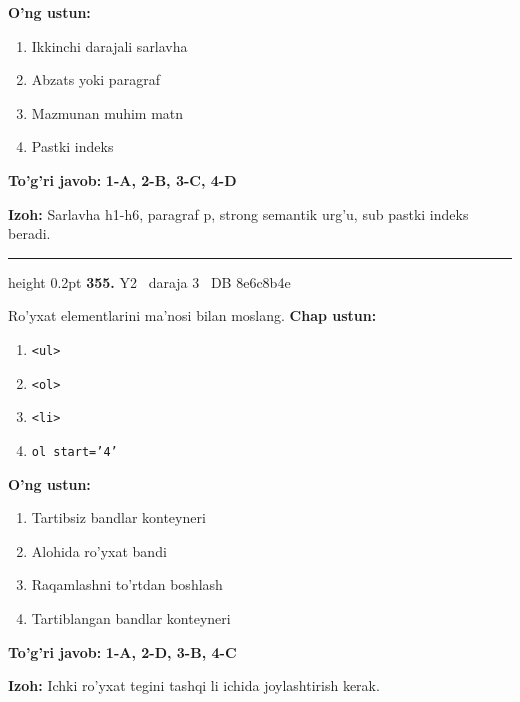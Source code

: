 \documentclass[10pt,a4paper,oneside]{article}
\begin{document}
\textbf{\footnotesize O'ng ustun:}
\begin{enumerate}[label=\Alph*),leftmargin=9mm]
\item Ikkinchi darajali sarlavha
\item Abzats yoki paragraf
\item Mazmunan muhim matn
\item Pastki indeks
\end{enumerate}
\begin{tcolorbox}[enhanced,breakable,colback=teal!4,colframe=teal!45!black,boxrule=0.45pt,arc=1.2mm,left=2.8mm,right=2.8mm,top=2mm,bottom=2mm,before skip=2mm,after skip=2mm]
\textbf{\color{teal}To'g'ri javob:} \textbf{1-A, 2-B, 3-C, 4-D}
\par\smallskip
\textbf{Izoh:} Sarlavha h1-h6, paragraf p, strong semantik urg'u, sub pastki indeks beradi.
\end{tcolorbox}
\vspace{2mm}\hrule height 0.2pt \vspace{4mm}
\hypertarget{q355}{\textbf{\color{ink}355.}}  {\color{muted}\scriptsize Y2 \textbullet\ daraja 3 \textbullet\ DB 8e6c8b4e}
\par
Ro'yxat elementlarini ma'nosi bilan moslang.
\textbf{\footnotesize Chap ustun:}
\begin{enumerate}[label=\arabic*),leftmargin=9mm]
\item \texttt{\textless{}ul\textgreater{}}
\item \texttt{\textless{}ol\textgreater{}}
\item \texttt{\textless{}li\textgreater{}}
\item \texttt{ol start='4'}
\end{enumerate}
\textbf{\footnotesize O'ng ustun:}
\begin{enumerate}[label=\Alph*),leftmargin=9mm]
\item Tartibsiz bandlar konteyneri
\item Alohida ro'yxat bandi
\item Raqamlashni to'rtdan boshlash
\item Tartiblangan bandlar konteyneri
\end{enumerate}
\begin{tcolorbox}[enhanced,breakable,colback=teal!4,colframe=teal!45!black,boxrule=0.45pt,arc=1.2mm,left=2.8mm,right=2.8mm,top=2mm,bottom=2mm,before skip=2mm,after skip=2mm]
\textbf{\color{teal}To'g'ri javob:} \textbf{1-A, 2-D, 3-B, 4-C}
\par\smallskip
\textbf{Izoh:} Ichki ro'yxat tegini tashqi li ichida joylashtirish kerak.
\end{tcolorbox}
\end{document}
